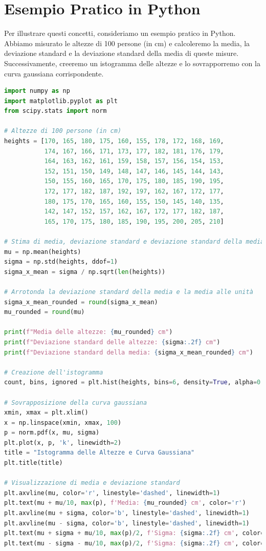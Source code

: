 \section{Esempio Pratico in Python}
Per illustrare questi concetti, consideriamo un esempio pratico in Python. Abbiamo misurato le altezze di 100 persone (in cm) e calcoleremo la media, la deviazione standard e la deviazione standard della media di queste misure. Successivamente, creeremo un istogramma delle altezze e lo sovrapporremo con la curva gaussiana corrispondente.

\begin{lstlisting}[language=Python, caption={Script Python per calcolare e visualizzare le altezze}]
import numpy as np
import matplotlib.pyplot as plt
from scipy.stats import norm

# Altezze di 100 persone (in cm)
heights = [170, 165, 180, 175, 160, 155, 178, 172, 168, 169, 
           174, 167, 166, 171, 173, 177, 182, 181, 176, 179, 
           164, 163, 162, 161, 159, 158, 157, 156, 154, 153, 
           152, 151, 150, 149, 148, 147, 146, 145, 144, 143,
           150, 155, 160, 165, 170, 175, 180, 185, 190, 195,
           172, 177, 182, 187, 192, 197, 162, 167, 172, 177,
           180, 175, 170, 165, 160, 155, 150, 145, 140, 135,
           142, 147, 152, 157, 162, 167, 172, 177, 182, 187,
           165, 170, 175, 180, 185, 190, 195, 200, 205, 210]

# Stima di media, deviazione standard e deviazione standard della media
mu = np.mean(heights)
sigma = np.std(heights, ddof=1)
sigma_x_mean = sigma / np.sqrt(len(heights))

# Arrotonda la deviazione standard della media e la media alle unità
sigma_x_mean_rounded = round(sigma_x_mean)
mu_rounded = round(mu)

print(f"Media delle altezze: {mu_rounded} cm")
print(f"Deviazione standard delle altezze: {sigma:.2f} cm")
print(f"Deviazione standard della media: {sigma_x_mean_rounded} cm")

# Creazione dell'istogramma
count, bins, ignored = plt.hist(heights, bins=6, density=True, alpha=0.6, color='g', edgecolor='black')

# Sovrapposizione della curva gaussiana
xmin, xmax = plt.xlim()
x = np.linspace(xmin, xmax, 100)
p = norm.pdf(x, mu, sigma)
plt.plot(x, p, 'k', linewidth=2)
title = "Istogramma delle Altezze e Curva Gaussiana"
plt.title(title)

# Visualizzazione di media e deviazione standard
plt.axvline(mu, color='r', linestyle='dashed', linewidth=1)
plt.text(mu + mu/10, max(p), f'Media: {mu_rounded} cm', color='r')
plt.axvline(mu + sigma, color='b', linestyle='dashed', linewidth=1)
plt.axvline(mu - sigma, color='b', linestyle='dashed', linewidth=1)
plt.text(mu + sigma + mu/10, max(p)/2, f'Sigma: {sigma:.2f} cm', color='b')
plt.text(mu - sigma - mu/10, max(p)/2, f'Sigma: {sigma:.2f} cm', color='b')


\end{lstlisting}

